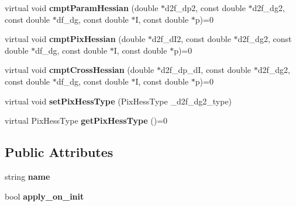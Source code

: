 \begin{DoxyCompactItemize}
\item 
\hypertarget{classIlluminationModel_a77c82e70e4bb6364e1e18b8e22ad5d1c}{virtual void {\bfseries cmpt\-Param\-Hessian} (double $\ast$d2f\-\_\-dp2, const double $\ast$d2f\-\_\-dg2, const double $\ast$df\-\_\-dg, const double $\ast$I, const double $\ast$p)=0}\label{classIlluminationModel_a77c82e70e4bb6364e1e18b8e22ad5d1c}

\item 
\hypertarget{classIlluminationModel_a8451e6a9da72a6c0d12ff2656cc18917}{virtual void {\bfseries cmpt\-Pix\-Hessian} (double $\ast$d2f\-\_\-d\-I2, const double $\ast$d2f\-\_\-dg2, const double $\ast$df\-\_\-dg, const double $\ast$I, const double $\ast$p)=0}\label{classIlluminationModel_a8451e6a9da72a6c0d12ff2656cc18917}

\item 
\hypertarget{classIlluminationModel_a6c6906805e0e9f740dba0db5c3d5d510}{virtual void {\bfseries cmpt\-Cross\-Hessian} (double $\ast$d2f\-\_\-dp\-\_\-d\-I, const double $\ast$d2f\-\_\-dg2, const double $\ast$df\-\_\-dg, const double $\ast$I, const double $\ast$p)=0}\label{classIlluminationModel_a6c6906805e0e9f740dba0db5c3d5d510}

\item 
\hypertarget{classIlluminationModel_a3607504c6f586e340329d9c612621d1e}{virtual void {\bfseries set\-Pix\-Hess\-Type} (Pix\-Hess\-Type \-\_\-d2f\-\_\-dg2\-\_\-type)}\label{classIlluminationModel_a3607504c6f586e340329d9c612621d1e}

\item 
\hypertarget{classIlluminationModel_ae83c96af1e730acbd58b8aac73766e78}{virtual Pix\-Hess\-Type {\bfseries get\-Pix\-Hess\-Type} ()=0}\label{classIlluminationModel_ae83c96af1e730acbd58b8aac73766e78}

\end{DoxyCompactItemize}
\subsection*{Public Attributes}
\begin{DoxyCompactItemize}
\item 
\hypertarget{classIlluminationModel_ad96e45e4f447219d90eac2e1fe0f7848}{string {\bfseries name}}\label{classIlluminationModel_ad96e45e4f447219d90eac2e1fe0f7848}

\item 
\hypertarget{classIlluminationModel_ab1f442b134340b3061937f0dad5d3e83}{bool {\bfseries apply\-\_\-on\-\_\-init}}\label{classIlluminationModel_ab1f442b134340b3061937f0dad5d3e83}

\end{DoxyCompactItemize}
